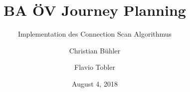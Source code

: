 \title{BA ÖV Journey Planning}
\subtitle{Implementation des Connection Scan Algorithmus}
\date{August 4, 2018}
\author{ Christian Bühler \and Flavio Tobler}

\maketitle